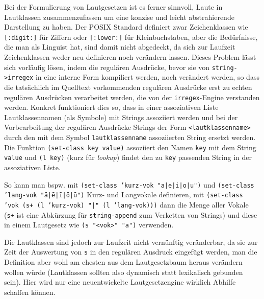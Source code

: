 \documentclass[12pt,a4paper,normalheadings]{scrartcl}
\def\tt#1{\texttt{#1}}
\begin{document}
Bei der Formulierung von Lautgesetzen ist es ferner sinnvoll,
Laute in Lautklassen zusammenzufassen um eine konzise
und leicht abstrahierende Darstellung zu haben.
Der POSIX Standard definiert zwar Zeichenklassen wie \tt{[:digit:]}
für Ziffern oder \tt{[:lower:]} für Kleinbuchstaben,
aber die Bedürfnisse, die man als Linguist hat,
sind damit nicht abgedeckt,
da sich zur Laufzeit Zeichenklassen weder neu definieren noch verändern lassen.
Dieses Problem lässt sich vorläufig lösen,
indem die regulären Ausdrücke,
bevor sie von \tt{string->irregex} in eine interne Form kompiliert werden,
noch verändert werden,
so dass die tatsächlich im Quelltext vorkommenden regulären Ausdrücke
erst zu echten regulären Ausdrücken verarbeitet werden,
die von der \tt{irregex}-Engine verstanden werden.
Konkret funktioniert dies so,
dass in einer assoziativen Liste Lautklassennamen (als Symbole)
mit Strings assoziiert werden
und bei der Vorbearbeitung der regulären Ausdrücke
Strings der Form \tt{<lautklassenname>} durch den mit dem Symbol
\tt{lautklassenname} assoziierten String ersetzt werden.
Die Funktion \tt{(set-class key value)} assoziiert den Namen \tt{key}
mit dem String \tt{value} und \tt{(l key)} (kurz für \emph{lookup})
findet den zu \tt{key} passenden String in der assoziativen Liste.

So kann man bspw. mit \tt{(set-class 'kurz-vok "a|e|i|o|u")} und
\tt{(set-class 'lang-vok "ā|ē|ī|ō|ū")} Kurz- und Langvokale definieren,
mit \tt{(set-class 'vok (s+ (l 'kurz-vok) "|" (l 'lang-vok)))} dann die Menge
aller Vokale
(\tt{s+} ist eine Abkürzung für \tt{string-append} zum Verketten von Strings)
und diese in einem Lautgesetz wie \tt{(s "<vok>" "a")} verwenden.

Die Lautklassen sind jedoch zur Laufzeit nicht vernünftig veränderbar,
da sie zur Zeit der Auswertung von \tt{s} in den regulären Ausdruck
eingefügt werden,
man die Definition aber wohl am ehesten aus dem Lautgesetzbaum heraus
verändern wollen würde
(Lautklassen sollten also dynamisch statt lexikalisch gebunden sein).
Hier wird nur eine neuentwickelte Lautgesetzengine wirklich
Abhilfe schaffen können.
\end{document}
